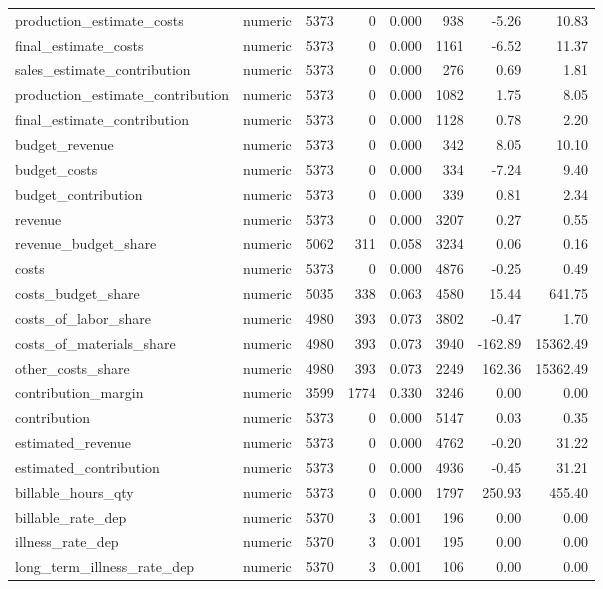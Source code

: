 \begin{landscape}
\begin{longtable}[t]{llrrrrrr}
production\_estimate\_costs & numeric & 5373 & 0 & 0.000 & 938 & -5.26 & 10.83\\
final\_estimate\_costs & numeric & 5373 & 0 & 0.000 & 1161 & -6.52 & 11.37\\
sales\_estimate\_contribution & numeric & 5373 & 0 & 0.000 & 276 & 0.69 & 1.81\\
production\_estimate\_contribution & numeric & 5373 & 0 & 0.000 & 1082 & 1.75 & 8.05\\
final\_estimate\_contribution & numeric & 5373 & 0 & 0.000 & 1128 & 0.78 & 2.20\\
budget\_revenue & numeric & 5373 & 0 & 0.000 & 342 & 8.05 & 10.10\\
budget\_costs & numeric & 5373 & 0 & 0.000 & 334 & -7.24 & 9.40\\
budget\_contribution & numeric & 5373 & 0 & 0.000 & 339 & 0.81 & 2.34\\
revenue & numeric & 5373 & 0 & 0.000 & 3207 & 0.27 & 0.55\\
revenue\_budget\_share & numeric & 5062 & 311 & 0.058 & 3234 & 0.06 & 0.16\\
costs & numeric & 5373 & 0 & 0.000 & 4876 & -0.25 & 0.49\\
costs\_budget\_share & numeric & 5035 & 338 & 0.063 & 4580 & 15.44 & 641.75\\
costs\_of\_labor\_share & numeric & 4980 & 393 & 0.073 & 3802 & -0.47 & 1.70\\
costs\_of\_materials\_share & numeric & 4980 & 393 & 0.073 & 3940 & -162.89 & 15362.49\\
other\_costs\_share & numeric & 4980 & 393 & 0.073 & 2249 & 162.36 & 15362.49\\
contribution\_margin & numeric & 3599 & 1774 & 0.330 & 3246 & 0.00 & 0.00\\
contribution & numeric & 5373 & 0 & 0.000 & 5147 & 0.03 & 0.35\\
estimated\_revenue & numeric & 5373 & 0 & 0.000 & 4762 & -0.20 & 31.22\\
estimated\_contribution & numeric & 5373 & 0 & 0.000 & 4936 & -0.45 & 31.21\\
billable\_hours\_qty & numeric & 5373 & 0 & 0.000 & 1797 & 250.93 & 455.40\\
billable\_rate\_dep & numeric & 5370 & 3 & 0.001 & 196 & 0.00 & 0.00\\
illness\_rate\_dep & numeric & 5370 & 3 & 0.001 & 195 & 0.00 & 0.00\\
long\_term\_illness\_rate\_dep & numeric & 5370 & 3 & 0.001 & 106 & 0.00 & 0.00\\

\end{longtable}
\end{landscape}
